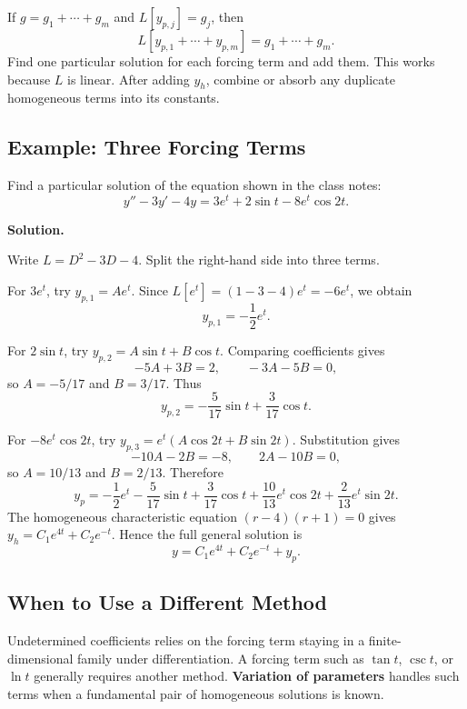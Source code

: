 \documentclass[11pt]{article}
\newenvironment{solution}
    {\par\noindent\textbf{Solution.}\par}
    {\par}
\begin{document}
If \(g=g_1+\cdots+g_m\) and \(L[y_{p,j}]=g_j\), then
\[
L[y_{p,1}+\cdots+y_{p,m}]=g_1+\cdots+g_m.
\]
Find one particular solution for each forcing term and add them.
This works because \(L\) is linear. After adding \(y_h\), combine or
absorb any duplicate homogeneous terms into its constants.

\subsection{Example: Three Forcing Terms}

Find a particular solution of the equation shown in the class notes:
\[
y''-3y'-4y=3e^t+2\sin t-8e^t\cos2t.
\]

\begin{solution}
Write \(L=D^2-3D-4\). Split the right-hand side into three terms.

For \(3e^t\), try \(y_{p,1}=Ae^t\). Since
\(L[e^t]=(1-3-4)e^t=-6e^t\), we obtain
\[
y_{p,1}=-\frac12e^t.
\]

For \(2\sin t\), try
\(y_{p,2}=A\sin t+B\cos t\). Comparing coefficients gives
\[
-5A+3B=2,\qquad -3A-5B=0,
\]
so \(A=-5/17\) and \(B=3/17\). Thus
\[
y_{p,2}=-\frac5{17}\sin t+\frac3{17}\cos t.
\]

For \(-8e^t\cos2t\), try
\(y_{p,3}=e^t(A\cos2t+B\sin2t)\). Substitution gives
\[
-10A-2B=-8,\qquad 2A-10B=0,
\]
so \(A=10/13\) and \(B=2/13\). Therefore
\[
\boxed{y_p=-\frac12e^t-\frac5{17}\sin t+\frac3{17}\cos t
+\frac{10}{13}e^t\cos2t+\frac2{13}e^t\sin2t.}
\]
The homogeneous characteristic equation
\((r-4)(r+1)=0\) gives
\(y_h=C_1e^{4t}+C_2e^{-t}\). Hence the full general solution is
\[
\boxed{y=C_1e^{4t}+C_2e^{-t}+y_p.}
\]
\end{solution}

\subsection{When to Use a Different Method}

Undetermined coefficients relies on the forcing term staying in a
finite-dimensional family under differentiation. A forcing term such
as \(\tan t\), \(\csc t\), or \(\ln t\) generally requires another
method. \textbf{Variation of parameters} handles such terms when a
fundamental pair of homogeneous solutions is known.
\end{document}
